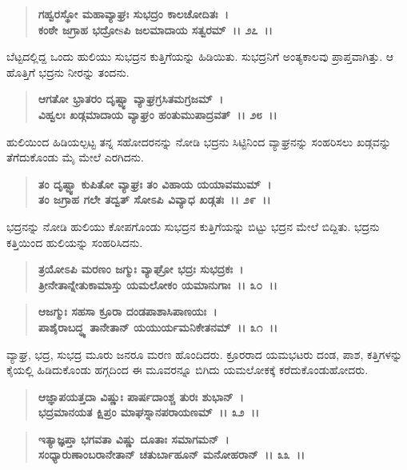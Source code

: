 \begin{verse}
\textbf{ಗಹ್ವರಸ್ಥೋ ಮಹಾವ್ಯಾಘ್ರಃ ಸುಭದ್ರಂ ಕಾಲಚೋದಿತಃ~।}\\\textbf{ಕಂಠೇ ಜಗ್ರಾಹ ಭದ್ರೋsಪಿ ಜಲಮಾದಾಯ ಸತ್ವರಮ್~।। ೨೭~।।}
\end{verse}

ಬೆಟ್ಟದಲ್ಲಿದ್ದ ಒಂದು ಹುಲಿಯು ಸುಭದ್ರನ ಕುತ್ತಿಗೆಯನ್ನು ಹಿಡಿಯಿತು. ಸುಭದ್ರನಿಗೆ ಅಂತ್ಯಕಾಲವು ಪ್ರಾಪ್ತವಾಗಿತ್ತು. ಆ ಹೊತ್ತಿಗೆ ಭದ್ರನು ನೀರನ್ನು ತಂದನು.

\begin{verse}
\textbf{ಆಗತೋ ಭ್ರಾತರಂ ದೃಷ್ಟ್ವಾ ವ್ಯಾಘ್ರಗ್ರಸಿತಮಗ್ರಜಮ್~।}\\\textbf{ವಿಹ್ವಲಃ ಖಡ್ಗಮಾದಾಯ ವ್ಯಾಘ್ರಂ ಹಂತುಮುಪಾದ್ರವತ್~।। ೨೮~।।}
\end{verse}

ಹುಲಿಯಿಂದ ಹಿಡಿಯಲ್ಪಟ್ಟ ತನ್ನ ಸಹೋದರನನ್ನು ನೋಡಿ ಭದ್ರನು ಸಿಟ್ಟಿನಿಂದ ವ್ಯಾಘ್ರನನ್ನು ಸಂಹರಿಸಲು ಖಡ್ಗವನ್ನು ತೆಗೆದುಕೊಂಡು ಮೈ ಮೇಲೆ ಎರಗಿದನು.

\begin{verse}
\textbf{ತಂ ದೃಷ್ಟ್ವಾ ಕುಪಿತೋ ವ್ಯಾಘ್ರಃ ತಂ ವಿಹಾಯ ಯಯಾವಮುಮ್~।}\\\textbf{ತಂ ಜಗ್ರಾಹ ಗಲೇ ತದ್ವತ್ ಸೋಽಪಿ ವಿವ್ಯಾಧ ಖಡ್ಗತಃ~।। ೨೯~।।}
\end{verse}

ಭದ್ರನನ್ನು ನೋಡಿ ಹುಲಿಯು ಕೋಪಗೊಂಡು ಸುಭದ್ರನ ಕುತ್ತಿಗೆಯನ್ನು ಬಿಟ್ಟು ಭದ್ರನ ಮೇಲೆ ಬಿದ್ದಿತು. ಭದ್ರನು ಕತ್ತಿಯಿಂದ ಹುಲಿಯನ್ನು ಸಂಹರಿಸಿದನು.

\begin{verse}
\textbf{ತ್ರಯೋಽಪಿ ಮರಣಂ ಜಗ್ಮುಃ ವ್ಯಾಘ್ರೋ ಭದ್ರಃ ಸುಭದ್ರಕಃ~।}\\\textbf{ತ್ರೀನೇತಾನ್ನೇತುಕಾಮಾಸ್ತು ಯಮಲೋಕಂ ಯಮಾನುಗಾಃ~।। ೩೦~।।} 
\end{verse}

\begin{verse}
\textbf{ಆಜಗ್ಮುಃ ಸಹಸಾ ಕ್ರೂರಾ ದಂಡಪಾಶಾಸಿಪಾಣಯಃ~।}\\\textbf{ಪಾಶೈರಾಬದ್ಧ್ಯ ತಾನೇತಾನ್ ಯಯುರ್ಯಮನಿಕೇತನಮ್~।। ೩೧~।।}
\end{verse}

ವ್ಯಾಘ್ರ, ಭದ್ರ, ಸುಭದ್ರ ಮೂರು ಜನರೂ ಮರಣ ಹೊಂದಿದರು. ಕ್ರೂರರಾದ ಯಮಭಟರು ದಂಡ, ಪಾಶ, ಕತ್ತಿಗಳನ್ನು ಕೈಯಲ್ಲಿ ಹಿಡಿದುಕೊಂಡು ಹಗ್ಗದಿಂದ ಈ ಮೂವರನ್ನೂ ಬಿಗಿದು ಯಮಲೋಕಕ್ಕೆ ಕರೆದುಕೊಂಡುಹೋದರು.

\begin{verse}
\textbf{ಆಜ್ಞಾಪಯತ್ತದಾ ವಿಷ್ಣುಃ ಪಾರ್ಷದಾಂಶ್ಚ ತುರಃ ಶುಭಾನ್~।}\\\textbf{ಭದ್ರಮಾನಯತ ಕ್ಷಿಪ್ರಂ ಮಾಘಸ್ನಾನಪರಾಯಣಮ್~।। ೩೨~।।} 
\end{verse}

\begin{verse}
\textbf{ಇತ್ಯಾಜ್ಞಪ್ತಾ ಭಗವತಾ ವಿಷ್ಣು ದೂತಾಃ ಸಮಾಗಮನ್~।}\\\textbf{ಸಂಧ್ಯಾರುಣಾಂಬರಾನೇತಾನ್ ಚತುರ್ಬಾಹೂನ್ ಮನೋಹರಾನ್~।। ೩೩~।। }
\end{verse}

